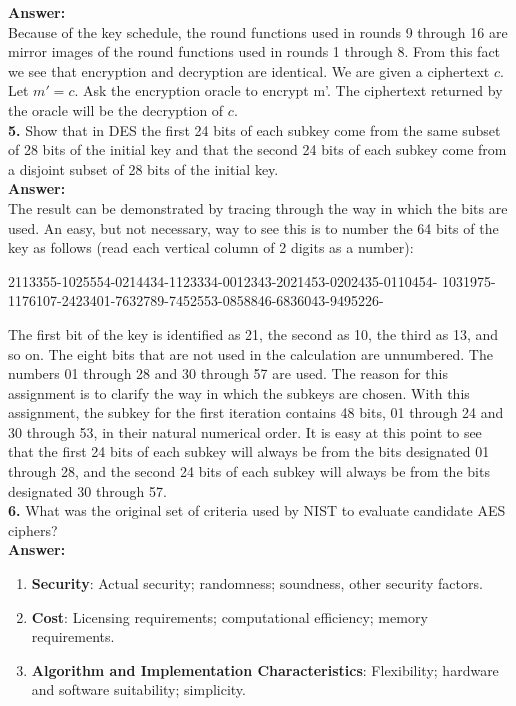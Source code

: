 \documentclass[paper=a4, fontsize=11pt]{scrartcl} %
\numberwithin{equation}{section} %
\numberwithin{figure}{section} %
\numberwithin{table}{section} %
\begin{document}
\textbf{Answer:}\\

Because of the key schedule, the round functions used in rounds 9 through 16 are mirror images of the round functions used in rounds 1 through 8. From this fact we see that encryption and decryption are identical. We are given a ciphertext $c$. Let $m' = c$. Ask the encryption oracle to encrypt m'. The ciphertext returned by the oracle will be the decryption of $c$.\\

\textbf{5.} Show that in DES the first 24 bits of each subkey come from the same subset of 28 bits of the initial key and that the second 24 bits of each subkey come from a disjoint subset of 28 bits of the initial key.\\

\textbf{Answer:}\\

The result can be demonstrated by tracing through the way in which the bits are used. An easy, but not necessary, way to see this is to number the 64 bits of the key as follows (read each vertical column of 2 digits as a number):
\begin{center}
2113355-1025554-0214434-1123334-0012343-2021453-0202435-0110454-
1031975-1176107-2423401-7632789-7452553-0858846-6836043-9495226-
\end{center}
The first bit of the key is identified as 21, the second as 10, the third as 13, and so on. The eight bits that are not used in the calculation are unnumbered. The numbers 01 through 28 and 30 through 57 are used. The reason for this assignment is to clarify the way in which the subkeys are chosen. With this assignment, the subkey for the first iteration contains 48 bits, 01 through 24 and 30 through 53, in their natural numerical order. It is easy at this point to see that the first 24 bits of each subkey will always be from the bits designated 01 through 28, and the second 24 bits of each subkey will always be from the bits designated 30 through 57.\\

\textbf{6.} What was the original set of criteria used by NIST to evaluate candidate AES ciphers?\\

\textbf{Answer:}
\begin{enumerate}
\item \textbf{Security}: Actual security; randomness; soundness, other security factors.
\item \textbf{Cost}: Licensing requirements; computational efficiency; memory requirements.
\item \textbf{Algorithm and Implementation Characteristics}: Flexibility; hardware and software suitability; simplicity.
\end{enumerate}
\end{document}
